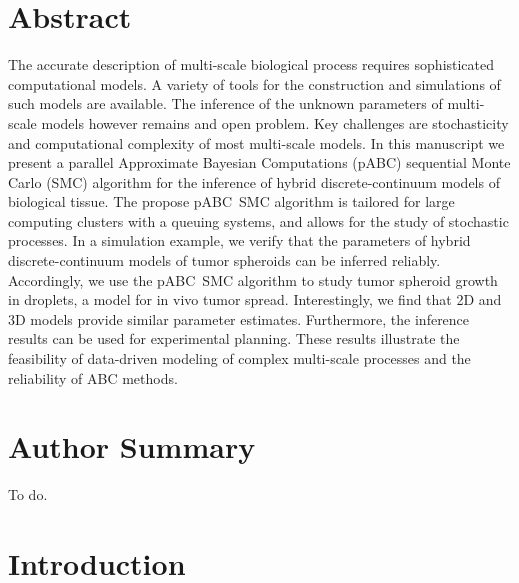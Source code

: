 \documentclass[10pt,letterpaper]{article}
\begin{document}
\tableofcontents

\section*{Abstract}
The accurate description of multi-scale biological process requires sophisticated computational models. A variety of tools for the construction and simulations of such models are available. The inference of the unknown parameters of multi-scale models however remains and open problem. Key challenges are stochasticity and computational complexity of most multi-scale models. In this manuscript we present a parallel Approximate Bayesian Computations (pABC) sequential Monte Carlo (SMC) algorithm for the inference of hybrid discrete-continuum models of biological tissue. The propose pABC~SMC algorithm is tailored for large computing clusters with a queuing systems, and allows for the study of stochastic processes. In a simulation example, we verify that the parameters of hybrid discrete-continuum models of tumor spheroids can be inferred reliably. Accordingly, we use the pABC~SMC algorithm to study tumor spheroid growth in droplets, a model for in vivo tumor spread. Interestingly, we find that 2D and 3D models provide similar parameter estimates. Furthermore, the inference results can be used for experimental planning. These results illustrate the feasibility of data-driven modeling of complex multi-scale processes and the reliability of ABC methods.

\section*{Author Summary}
To do.

\linenumbers

\section*{Introduction}
\end{document}
